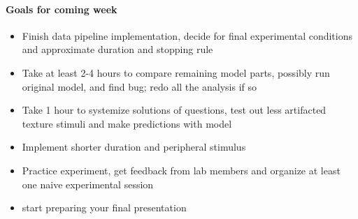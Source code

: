 \paragraph{Goals for coming week}
\begin{itemize}
	\item Finish data pipeline implementation, decide for final experimental conditions and approximate duration and stopping rule
	\item Take at least 2-4 hours to compare remaining model parts, possibly run original model, and find bug; redo all the analysis if so
	\item Take 1 hour to systemize solutions of questions, test out less artifacted texture stimuli and make predictions with model 
	\item Implement shorter duration and peripheral stimulus
	\item Practice experiment, get feedback from lab members and organize at least one naive experimental session
	\item start preparing your final presentation
\end{itemize}